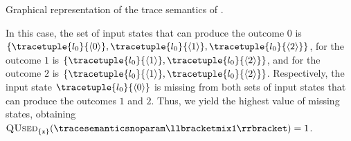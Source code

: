 \begin{example}
\begin{marginfigure}[*-2]
  \caption{Graphical representation of the trace semantics of .}
  \end{marginfigure}
  In this case, the set of input states that can produce the outcome $0$ is $\{\tracetuple{\locinit}{\langle 0\rangle}, \tracetuple{\locinit}{\langle 1\rangle}, \tracetuple{\locinit}{\langle 2\rangle}\}$, for the outcome $1$ is $\{\tracetuple{\locinit}{\langle 1\rangle}, \tracetuple{\locinit}{\langle 2\rangle}\}$, and for the outcome $2$ is $\{\tracetuple{\locinit}{\langle 1\rangle}, \tracetuple{\locinit}{\langle 2\rangle}\}$.
  Respectively, the input state $\tracetuple{\locinit}{\langle 0 \rangle}$ is missing from both sets of input states that can produce the outcomes $1$ and $2$.
  Thus, we yield the highest value of missing states, obtaining $\qusedname_{\{\texttt{x}\}}(\tracesemanticsnoparam\semanticsof{\texttt{mix1}})=1$.



\end{example}
